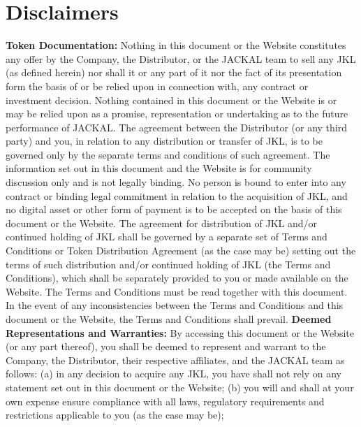 \documentclass[11pt, nofootinbib]{article}
\begin{document}
\section{Disclaimers}
\tiny{
\textbf{Token Documentation:} Nothing in this document or the Website constitutes any offer by the Company, the Distributor, or the JACKAL team to sell any JKL (as defined
herein) nor shall it or any part of it nor the fact of its presentation form the basis of or be relied upon in connection with, any contract or investment decision. Nothing contained
in this document or the Website is or may be relied upon as a promise, representation or undertaking as to the future performance of JACKAL. The agreement between the
Distributor (or any third party) and you, in relation to any distribution or transfer of JKL, is to be governed only by the separate terms and conditions of such agreement. The
information set out in this document and the Website is for community discussion only and is not legally binding. No person is bound to enter into any contract or binding legal
commitment in relation to the acquisition of JKL, and no digital asset or other form of payment is to be accepted on the basis of this document or the Website. The agreement
for distribution of JKL and/or continued holding of JKL shall be governed by a separate set of Terms and Conditions or Token Distribution Agreement (as the case may be)
setting out the terms of such distribution and/or continued holding of JKL (the Terms and Conditions), which shall be separately provided to you or made available on the
Website. The Terms and Conditions must be read together with this document. In the event of any inconsistencies between the Terms and Conditions and this document or
the Website, the Terms and Conditions shall prevail.
\newline\newline
\textbf{Deemed Representations and Warranties:} By accessing this document or the Website (or any part thereof), you shall be deemed to represent and warrant to the Company,
the Distributor, their respective affiliates, and the JACKAL team as follows:\newline\newline
(a) in any decision to acquire any JKL, you have shall not rely on any statement set out in this document or the Website;\newline\newline
(b) you will and shall at your own expense ensure compliance with all laws, regulatory requirements and restrictions applicable to you (as the case may be);\newline\newline
}
\end{document}
